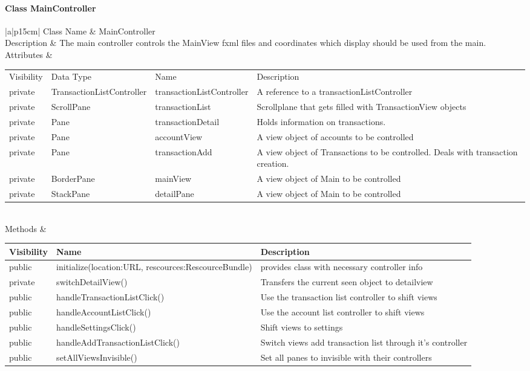 \documentclass[12pt]{article}
\begin{document}
\paragraph{Class MainController}
\begin{table}[H]
	\begin{tabular}{|a|p{15cm}|}
		\hline
		{Class Name} & {MainController} \\
		\hline
		Description & The main controller controls the MainView fxml files and coordinates which display should be used from the main.\\
		\hline
		Attributes & 
		\begin{tabular}{| p{1.5cm} | p{4.5cm} | p{4.45cm} | p{3.0cm} |}
			\hline
			\rowcolor{lightgray}
			Visibility & Data Type & Name & Description \\
			\rowcolor{white}
			\hline
			private & TransactionListController & transactionListController & A reference to a transactionListController\\
			\hline
			private & ScrollPane & transactionList & Scrollplane that gets filled with TransactionView objects  \\
			\hline
			private & Pane & transactionDetail & Holds information on transactions.  \\
			\hline
			private & Pane & accountView & A view object of accounts to be controlled \\
			\hline
			private & Pane & transactionAdd & A view object of Transactions to be controlled. Deals with transaction creation. \\
			\hline
			private & BorderPane & mainView & A view object of Main to be controlled \\
			\hline
			private & StackPane & detailPane & A view object of Main to be controlled \\
			\hline
		\end{tabular} \\
		\hline
		Methods & 		 
		\begin{tabular}{| p{1.5cm} | p{6.5cm} | p{5.9cm} |}
			\hline
			\rowcolor{gray}
			{Visibility} &{Name} & {Description} \\
			\hline
			\rowcolor{white}			
			public & initialize(location:URL, rescources:RescourceBundle) & provides class with necessary controller info\\
			\hline
			private&  switchDetailView() & Transfers the current seen object to detailview \\
			\hline
			public 	& handleTransactionListClick()  & Use the transaction list controller to shift views\\
			\hline
			public 	& handleAccountListClick() & Use the account list controller to shift views\\
			\hline
			public 	&  handleSettingsClick() & Shift views to settings\\
			\hline
			public &  handleAddTransactionListClick() & Switch views add transaction list through it's controller\\
			\hline
			public & setAllViewsInvisible()  & Set all panes to invisible with their controllers\\
			\hline
			

\end{tabular}
\end{tabular}
\end{table}
\end{document}
